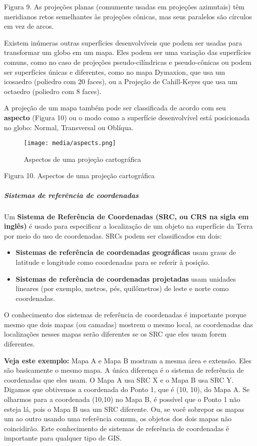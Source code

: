 \documentclass[
]{book}
\providecommand{\tightlist}{%
  \setlength{\itemsep}{0pt}\setlength{\parskip}{0pt}}
\theoremstyle{definition}
\theoremstyle{definition}
\theoremstyle{definition}
\theoremstyle{definition}
\theoremstyle{remark}
\begin{document}
Figura 9. As projeções planas (comumente usadas em projeções azimutais) têm meridianos retos semelhantes às projeções cônicas, mas seus paralelos são círculos em vez de arcos.

Existem inúmeras outras superfícies desenvolvíveis que podem ser usadas para transformar um globo em um mapa. Eles podem ser uma variação das superfícies comuns, como no caso de projeções pseudo-cilíndricas e pseudo-cônicas ou podem ser superfícies únicas e diferentes, como no mapa Dymaxion, que usa um icosaedro (poliedro com 20 faces), ou a Projeção de Cahill-Keyes que usa um octaedro (poliedro com 8 faces).

A projeção de um mapa também pode ser classificada de acordo com seu \textbf{aspecto} (Figura 10) ou o modo como a superfície desenvolvível está posicionada no globo: Normal, Transversal ou Oblíqua.

\begin{figure}
\centering
\texttt{[image: media/aspects.png]}
\caption{Aspectos de uma projeção cartográfica}
\end{figure}

Figura 10. Aspectos de uma projeção cartográfica

\hypertarget{sistemas-de-referuxeancia-de-coordenadas}{%
\subparagraph{Sistemas de referência de coordenadas}\label{sistemas-de-referuxeancia-de-coordenadas}}

Um \textbf{Sistema de Referência de Coordenadas (SRC, ou CRS na sigla em inglês)} é usado para especificar a localização de um objeto na superfície da Terra por meio do uso de coordenadas. SRCs podem ser classificados em dois:

\begin{itemize}
\tightlist
\item
  \textbf{Sistemas de referência de coordenadas geográficas} usam graus de latitude e longitude como coordenadas para se referir à posição.
\item
  \textbf{Sistemas de referência de coordenadas projetadas} usam unidades lineares (por exemplo, metros, pés, quilômetros) de leste e norte como coordenadas.
\end{itemize}

O conhecimento dos sistemas de referência de coordenadas é importante porque mesmo que dois mapas (ou camadas) mostrem o mesmo local, as coordenadas das localizações nesses mapas serão diferentes se os SRC que eles usam forem diferentes.

\textbf{Veja este exemplo:} Mapa A e Mapa B mostram a mesma área e extensão. Eles são basicamente o mesmo mapa. A única diferença é o sistema de referência de coordenadas que eles usam. O Mapa A usa SRC X e o Mapa B usa SRC Y. Digamos que obtivemos a coordenada do Ponto 1, que é (10, 10), do Mapa A. Se olharmos para a coordenada (10,10) no Mapa B, é possível que o Ponto 1 não esteja lá, pois o Mapa B usa um SRC diferente. Ou, se você sobrepor os mapas um ao outro usando uma referência comum, os objetos dos dois mapas não coincidirão. Este conhecimento de sistemas de referência de coordenadas é importante para qualquer tipo de GIS.
\end{document}
